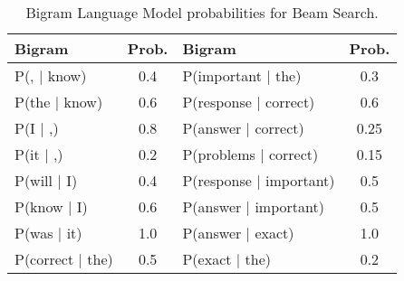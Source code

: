 \documentclass[12pt, letterpaper]{article}
\begin{document}
\begin{table}[h!]
    \centering
    \begin{tabular}{|l|c|l|c|}
    \toprule
        Bigram & Prob. & Bigram & Prob.\\
        \hline
        P(, $|$ know) & 0.4 & P(important $|$ the) & 0.3 \\
        P(the $|$ know) & 0.6 & P(response $|$ correct) & 0.6 \\
        P(I $|$ ,) & 0.8 & P(answer $|$ correct) & 0.25  \\
        P(it $|$ ,) & 0.2 & P(problems $|$ correct) & 0.15  \\
        P(will $|$ I) & 0.4 & P(response $|$ important) & 0.5 \\
        P(know $|$ I) & 0.6 & P(answer $|$ important) & 0.5\\
        P(was $|$ it) & 1.0 & P(answer $|$ exact) & 1.0 \\
        P(correct $|$ the) & 0.5 &  P(exact $|$ the) & 0.2 \\
    \bottomrule
    \end{tabular}
    \caption{Bigram Language Model probabilities for Beam Search.}
    \label{tab:bigram_prob}
\end{table}
\end{document}
